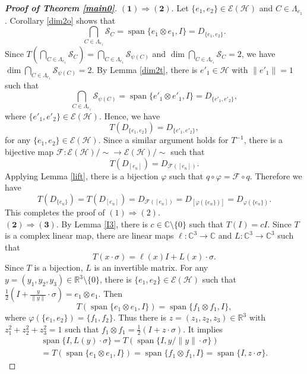 \documentclass[10pt,a4paper]{amsart}
\newcommand{\SC}{\mathcal{S}_C}
\newcommand{\Span}{\operatorname{span}}
\newcommand{\cH}{{\mathcal{H}}}
\begin{document}
\begin{proof}[{\textbf {Proof of Theorem \ref{main0}}}] 
$\bm{(1) \Rightarrow (2)}.$ Let $\{e_1,e_2\} \in \mathcal{E}(\cH)$ and  $C \in \Lambda_{e_1}$. Corollary \ref{dim2o} shows that 
\[
\bigcap_{C \in \Lambda_{e_1}} \SC=\Span\{e_1 \otimes e_1, I \}=D_{\{e_1,e_2\}}. 
\]
Since $T(\bigcap_{C \in \Lambda_{e_1}} \SC)=\bigcap_{C \in \Lambda_{e_1}} \mathcal{S}_{\psi(C)}$ and $\dim \bigcap_{C \in \Lambda_{e_1}} \SC=2$, we have $\dim \bigcap_{C \in \Lambda_{e_1}} \mathcal{S}_{\psi(C)}=2$. By Lemma \ref{dim2t},  there is $e'_1 \in \cH$ with $\|e'_1\|=1$ such that 
\[
\bigcap_{C \in \Lambda_{e_1}} \mathcal{S}_{\psi(C)}=\Span\{e'_1 \otimes e'_1, I \}=D_{\{e'_1,e'_2\}},
\]
where $\{e'_1, e'_2\} \in \mathcal{E}(\cH)$. 
Hence, we have 
\begin{equation}\label{diago}
T(D_{\{e_1,e_2\}})=D_{\{e'_1,e'_2\}}, 
\end{equation}
for any $\{e_1,e_2\}  \in \mathcal{E}(\cH)$. Since a similar argument holds for $T^{-1}$, there is a bijective map $\mathcal{F}: \mathcal{E}(\cH)/ \sim \to \mathcal{E}(\cH)/ \sim$ such that 
\[
T(D_{[e_n]})=D_{\mathcal{F}([e_n])}.
\]
Applying Lemma \ref{lift}, there is a bijection $\varphi$ such that $q\circ \varphi=\mathcal{F} \circ q$. Therefore we have
\[
T(D_{\{e_n\}})=T(D_{[e_n]})=D_{\mathcal{F}([e_n])}=D_{[\varphi(\{e_n\})]}=D_{\varphi(\{e_n\})}.
\] 
This completes the proof of  $(1)\Rightarrow(2)$. \\
$\bm{(2) \Rightarrow (3)}.$ 
By Lemma \ref{I3}, there is $c \in \mathbb{C} \setminus \{0\}$ such that $T(I)=cI$. Since $T$ is a complex linear map, there are linear maps $\ell: \mathbb{C}^3 \to \mathbb{C}$ and $L: \mathbb{C}^3 \to \mathbb{C}^3$ such that 
\[
T(x \cdot \sigma)=\ell(x)I+L(x)\cdot \sigma.
\]
Since $T$ is a bijection, $L$ is an invertible matrix. For any $y=(y_1, y_2, y_3) \in \mathbb{R}^3 \setminus \{0\}$, there is $\{e_1, e_2\} \in \mathcal{E}(\cH)$ such that $\frac{1}{2}(I+\frac{y}{\|y\|}\cdot \sigma)=e_1\otimes e_1$. Then %
\[
T(\Span\{e_1\otimes e_1, I\})=\Span\{f_1 \otimes f_1, I\},
\]
where $\varphi(\{e_1, e_2\})=\{f_1, f_2\}$. Thus there is $z=(z_1, z_2, z_3) \in \mathbb{R}^3$ with $z_1^2+z_2^2+z_3^2=1$ such that $f_1 \otimes f_1=\frac{1}{2}(I+z \cdot \sigma)$. 
It implies 
\begin{multline*}
\Span\{I, L(y)\cdot \sigma\}=T(\Span\{I, y/\|y\| \cdot \sigma\})\\=T(\Span\{e_1\otimes e_1, I\})=\Span\{f_1 \otimes f_1, I\}=\Span\{I, z \cdot \sigma\}.

\end{multline*}
\end{proof}
\end{document}
